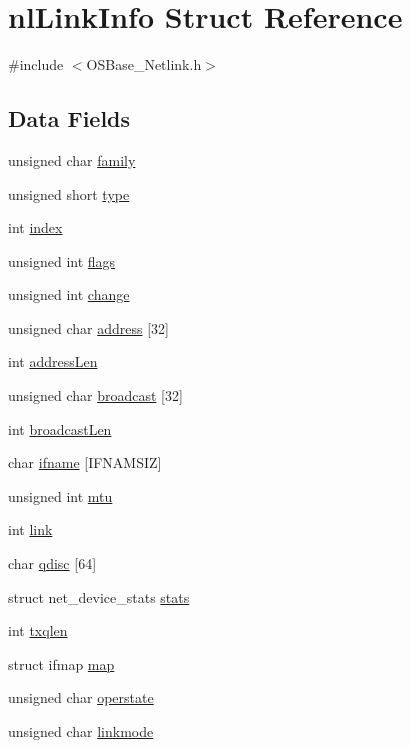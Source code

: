 \hypertarget{structnl_link_info}{
\section{nlLinkInfo Struct Reference}
\label{structnl_link_info}
}


{\ttfamily \#include $<$OSBase\_\-Netlink.h$>$}\subsection*{Data Fields}
\begin{DoxyCompactItemize}
\item 
unsigned char \hyperlink{structnl_link_info_a6f1c3e3a98f91eb22d3bbb7ea4828c86}{family}
\item 
unsigned short \hyperlink{structnl_link_info_aa929142c5ddf34cf0915c97a617a1a63}{type}
\item 
int \hyperlink{structnl_link_info_a750b5d744c39a06bfb13e6eb010e35d0}{index}
\item 
unsigned int \hyperlink{structnl_link_info_ac92588540e8c1d014a08cd8a45462b19}{flags}
\item 
unsigned int \hyperlink{structnl_link_info_adda9fdcf309da55ca70fe8fa44228669}{change}
\item 
unsigned char \hyperlink{structnl_link_info_a47f1d37ed4036597b5349643cdf0ee95}{address} \mbox{[}32\mbox{]}
\item 
int \hyperlink{structnl_link_info_a40ac8032a304ec8c7e75994741c59674}{addressLen}
\item 
unsigned char \hyperlink{structnl_link_info_a67a214db57ca3f0cf9379b5a2d7f5af5}{broadcast} \mbox{[}32\mbox{]}
\item 
int \hyperlink{structnl_link_info_a7be8940ebbe48647e242987fef72d3bd}{broadcastLen}
\item 
char \hyperlink{structnl_link_info_ac7b430acaa92a7a26fbcdad47d2efc20}{ifname} \mbox{[}IFNAMSIZ\mbox{]}
\item 
unsigned int \hyperlink{structnl_link_info_a5ac894ab93685970e62fbf6756f38309}{mtu}
\item 
int \hyperlink{structnl_link_info_af203a1810ce3b44e2b2219c63e0ceff9}{link}
\item 
char \hyperlink{structnl_link_info_a94e47ef065f1ff000d841f20ec8e197f}{qdisc} \mbox{[}64\mbox{]}
\item 
struct net\_\-device\_\-stats \hyperlink{structnl_link_info_a28d1784acc4686245082b95c528ae50b}{stats}
\item 
int \hyperlink{structnl_link_info_a6c449a25cfc076fbbea4f640804e5fe1}{txqlen}
\item 
struct ifmap \hyperlink{structnl_link_info_a042d45afd6edfb21fcfc73235b695caa}{map}
\item 
unsigned char \hyperlink{structnl_link_info_a6389aebefc5f2ef983c0fccfbdb0e042}{operstate}
\item 
unsigned char \hyperlink{structnl_link_info_ac505421ab0f5f1cf48029ff5bd30554c}{linkmode}
\end{DoxyCompactItemize}


